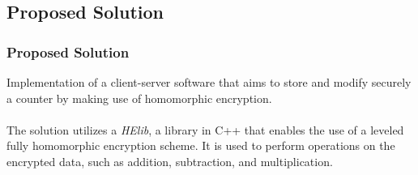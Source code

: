 \documentclass{beamer}
\begin{document}

\subsection{Proposed Solution}
\begin{frame}
\frametitle{Proposed Solution}

Implementation of a client-server software that aims to store and modify securely a counter by making use of homomorphic encryption.  \\~\\

The solution utilizes a \emph{HElib}, a library in C++ that enables the use of a leveled fully homomorphic encryption scheme. It is used to perform operations on the encrypted data, such as addition, subtraction, and multiplication. \\~\\

\end{frame}
\end{document}
